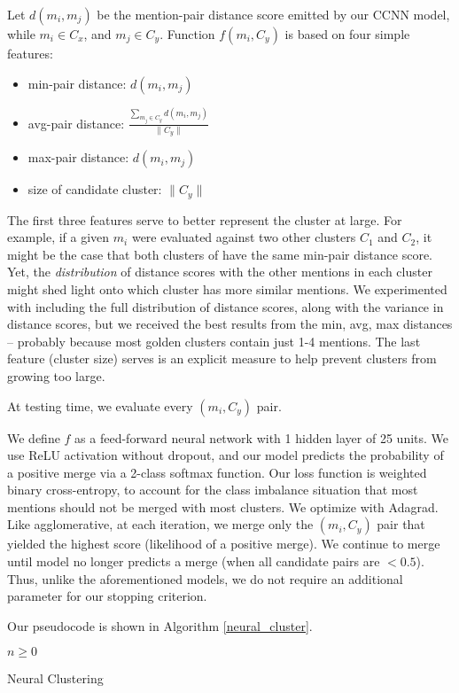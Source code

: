 \documentclass[11pt,a4paper]{article}
\begin{document}
Let $d(m_i,m_j)$ be the mention-pair distance score emitted by our CCNN model, while $m_i \in C_x$, and $m_j \in C_y$.  Function $f(m_i,C_y)$ is based on four simple features:
\begin{itemize}
  \item min-pair distance: $d(m_i,m_j)$
  \item avg-pair distance: $\frac{\sum_{m_j \in C_y} d(m_i,m_j)}{\|C_y\|}$
  \item max-pair distance: $d(m_i,m_j)$
  \item size of candidate cluster: $\|C_y\|$
\end{itemize}

The first three features serve to better represent the cluster at large.  For example, if a given $m_i$ were evaluated against two other clusters $C_1$ and $C_2$, it might be the case that both clusters of have the same min-pair distance score.  Yet, the \textit{distribution} of distance scores with the other mentions in each cluster might shed light onto which cluster has more similar mentions.  We experimented with including the full distribution of distance scores, along with the variance in distance scores, but we received the best results from the min, avg, max distances -- probably because most golden clusters contain just 1-4 mentions.  The last feature (cluster size) serves is an explicit measure to help prevent clusters from growing too large.

At testing time, we evaluate every $(m_i, C_y)$ pair.  

We define $f$ as a feed-forward neural network with 1 hidden layer of 25 units.  We use ReLU activation without dropout, and our model predicts the probability of a positive merge via a 2-class softmax function.  Our loss function is weighted binary cross-entropy, to account for the class imbalance situation that most mentions should not be merged with most clusters.  We optimize with Adagrad.  Like agglomerative, at each iteration, we merge only the $(m_i,C_y)$ pair that yielded the highest score (likelihood of a positive merge).  We continue to merge until model no longer predicts a merge (when all candidate pairs are $< 0.5$).  Thus, unlike the aforementioned models, we do not require an additional parameter for our stopping criterion.

Our pseudocode is shown in Algorithm \ref{neural_cluster}.

\begin{algorithm}
    \begin{algorithmic}[1]
       \Require $n \geq 0$
    \end{algorithmic}
\caption{Neural Clustering}
\label{neural_cluster}
\end{algorithm}
\end{document}
